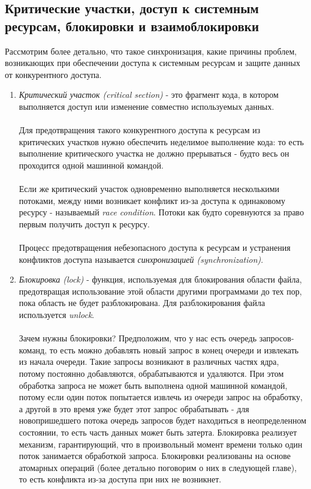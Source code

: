 \subsection{Критические участки, доступ к системным ресурсам, блокировки и взаимоблокировки}
Рассмотрим более детально, что такое синхронизация, какие причины проблем, возникающих при обеспечении доступа к системным ресурсам и защите данных от конкурентного доступа.
\begin{enumerate}
    \item \textit{Критический участок (critical section)} - это фрагмент кода, в котором выполняется доступ или изменение совместно используемых данных.
    \\\\
    Для предотвращения такого конкурентного доступа к ресурсам из критических
    участков нужно обеспечить неделимое выполнение кода: то есть выполнение критического участка не должно прерываться - будто весь он проходится одной машинной командой.
    \\\\
    Если же критический участок одновременно выполняется несколькими потоками, между ними возникает конфликт из-за доступа к одинаковому ресурсу - называемый \textit{race condition}. Потоки как будто соревнуются за право первым получить доступ к ресурсу.
    \\\\
    Процесс предотвращения небезопасного доступа к ресурсам и устранения конфликтов доступа называется \textit{синхронизацией (synchronization)}.
    \item \textit{Блокировка (lock)} - функция, используемая для блокирования области файла, предотвращая использование этой области другими программами до тех пор, пока область не будет разблокирована. Для разблокирования файла используется \textit{unlock}. 
    \\\\
    Зачем нужны блокировки? Предположим, что у нас есть очередь запросов-команд, то есть можно добавлять новый запрос в конец очереди и извлекать из начала очереди. Такие запросы возникают в различных частях ядра, потому постоянно добавляются, обрабатываются и удаляются. При этом обработка запроса не может быть выполнена одной машинной командой, потому если один поток попытается извлечь из очереди запрос на обработку, а другой в это время уже будет этот запрос обрабатывать - для новопришедшего потока очередь запросов будет находиться в неопределенном состоянии, то есть часть данных может быть затерта. Блокировка реализует механизм, гарантирующий, что в произвольный момент времени только один поток занимается обработкой запроса. Блокировки реализованы на основе атомарных операций (более детально поговорим о них в следующей главе), то есть конфликта из-за доступа при них не возникнет.

\end{enumerate}
